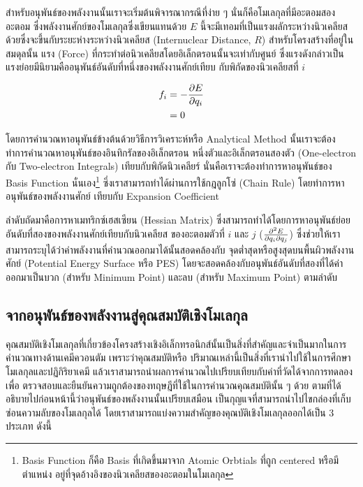 สำหรับอนุพันธ์ของพลังงานนั้นเราจะเริ่มต้นพิจารณากรณีที่ง่าย ๆ นั่นก็คือโมเลกุลที่มีอะตอมสองอะตอม ซึ่งพลังงานศักย์ของโมเลกุลซึ่งเขียนแทนด้วย $E$ 
นี้จะมีเทอมที่เป็นแรงผลักระหว่างนิวเคลียสด้วยซึ่งจะขึ้นกับระยะห่างระหว่างนิวเคลียส (Internuclear Distance, $R$) สำหรับโครงสร้างที่อยู่ในสมดุลนั้น 
แรง (Force) ที่กระทำต่อนิวเคลียสโดยอิเล็กตรอนนั้นจะเท่ากับศูนย์ ซึ่งแรงดังกล่าวเป็นแรงย่อยมีนิยามคืออนุพันธ์อันดับที่หนึ่งของพลังงานศักย์เทียบ%
กับพิกัดของนิวเคลียสที่ $i$

\begin{align}
    f_{i} &= - \pdv{E}{q_{i}} \\
    &= 0
\end{align}

โดยการคำนวณหาอนุพันธ์ข้างต้นด้วยวิธีการวิเคราะห์หรือ Analytical Method นั้นเราจะต้องทำการคำนวณหาอนุพันธ์ของอินทิกรัลของอิเล็กตรอน%
หนึ่งตัวและอิเล็กตรอนสองตัว (One-electron กับ Two-electron Integrals) เทียบกับพิกัดนิวเคลียร์ นั่นคือเราจะต้องทำการหาอนุพันธ์ของ 
Basis Function นั่นเอง\footnote{Basis Function ก็คือ Basis ที่เกิดขึ้นมาจาก Atomic Orbtials ที่ถูก centered หรือมีตำแหน่ง%
อยู่ที่จุดอ้างอิงของนิวเคลียสของอะตอมในโมเลกุล} ซึ่งเราสามารถทำได้ผ่านการใช้กฎลูกโซ่ (Chain Rule) โดยทำการหาอนุพันธ์ของพลังงานศักย์%
เทียบกับ Expansion Coefficient

ลำดับถัดมาคือการหาเมทริกซ์เฮสเซียน (Hessian Matrix) ซึ่งสามารถทำได้โดยการหาอนุพันธ์ย่อยอันดับที่สองของพลังงานศักย์เทียบกับนิวเคลียส%
ของอะตอมตัวที่ $i$ และ $j$ ($\pdv{E}{q_{i}}{q_{j}}$) ซึ่งช่วยให้เราสามารถระบุได้ว่าค่าพลังงานที่คำนวณออกมาได้นั้นสอดคล้องกับ%
จุดต่ำสุดหรือสูงสุดบนพื้นผิวพลังงานศักย์ (Potential Energy Surface หรือ PES) โดยจะสอดคล้องกับอนุพันธ์อันดับที่สองที่ได้ค่าออกมาเป็นบวก 
(สำหรับ Minimum Point) และลบ (สำหรับ Maximum Point) ตามลำดับ

\subsection{จากอนุพันธ์ของพลังงานสู่คุณสมบัติเชิงโมเลกุล}
\label{ssec:ener_der_mol_prop}

คุณสมบัติเชิงโมเลกุลที่เกี่ยวข้องโครงสร้างเชิงอิเล็กทรอนิกส์นั้นเป็นสิ่งที่สำคัญและจำเป็นมากในการคำนวณทางด้านเคมีควอนตัม เพราะว่าคุณสมบัติหรือ%
ปริมาณเหล่านี้เป็นสิ่งที่เรานำไปใช้ในการศึกษาโมเลกุลและปฏิกิริยาเคมี แล้วเราสามารถนำผลการคำนวณไปเปรียบเทียบกับค่าที่วัดได้จากการทดลองเพื่อ%
ตรวจสอบและยืนยันความถูกต้องของทฤษฎีที่ใช้ในการคำนวณคุณสมบัตินั้น ๆ ด้วย ตามที่ได้อธิบายไปก่อนหน้านี้ว่าอนุพันธ์ของพลังงานนั้นเปรียบเสมือน%
เป็นกุญแจที่สามารถนำไปไขกล่องที่เก็บซ่อนความลับของโมเลกุลได้ โดยเราสามารถแบ่งความสำคัญของคุณบัติเชิงโมเลกุลออกได้เป็น 3 ประเภท ดังนี้

